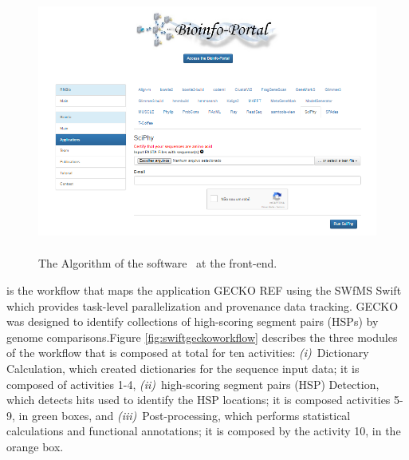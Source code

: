 \begin{figure}[!t]
\begin{center}
	\includegraphics[height=8.7cm]{imgs/sciphyalgorithm.png}
	\vspace{-7px}
\caption{The Algorithm of the software ~\sci at the \system front-end.} \label{fig:sciphyalgorithm}
\end{center}
\end{figure}

\vspace{5px}
\noindent
\underline{\textbf{\swift}} is the workflow that maps the application GECKO {REF} using the SWfMS Swift which provides task-level parallelization and provenance data tracking. GECKO was designed to identify collections of high-scoring segment pairs (HSPs) by genome comparisons.Figure \ref{fig:swiftgeckoworkflow} describes the three modules of the workflow \swift that is composed at total for ten activities:
\textit{(i)}~Dictionary Calculation, which created dictionaries for the sequence input data; it is composed of activities 1-4,
\textit{(ii)}~high-scoring segment pairs (HSP) Detection, which detects hits used to identify the HSP locations; it is composed activities 5-9, in green boxes, and
\textit{(iii)}~Post-processing, which performs statistical calculations and functional annotations; it is composed by the activity 10, in the orange box.
\vspace{5px}

